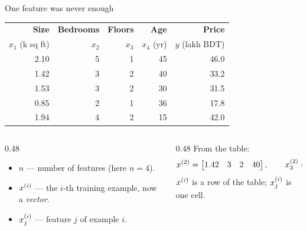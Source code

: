 \documentclass[aspectratio=169,10pt]{beamer}
\begin{document}
\begin{frame}{One feature was never enough}
  \footnotesize
  \begin{center}
  \renewcommand{\arraystretch}{1.25}
  \begin{tabular}{@{}rrrrr@{}}
    \toprule
    \textbf{Size} & \textbf{Bedrooms} & \textbf{Floors} & \textbf{Age} & \textbf{Price}\\
    $x_1$ (k sq ft) & $x_2$ & $x_3$ & $x_4$ (yr) & $y$ (lakh BDT)\\
    \midrule
    2.10 & 5 & 1 &  45 & 46.0\\
    1.42 & 3 & 2 &  40 & 33.2\\
    1.53 & 3 & 2 &  30 & 31.5\\
    0.85 & 2 & 1 &  36 & 17.8\\
    1.94 & 4 & 2 &  15 & 42.0\\
    \bottomrule
  \end{tabular}
  \end{center}
  \begin{columns}[T,onlytextwidth]
    \begin{column}{0.48\textwidth}
      \begin{defnbox}[Notation]
        \small
        \begin{itemize}
          \item $n$ --- number of features (here $n=4$).
          \item $x^{(i)}$ --- the $i$-th training example, now a \emph{vector}.
          \item $x^{(i)}_{j}$ --- feature $j$ of example $i$.
        \end{itemize}
      \end{defnbox}
    \end{column}
    \begin{column}{0.48\textwidth}
      \small
      From the table:
      \[ x^{(2)} = \begin{bmatrix} 1.42 & 3 & 2 & 40\end{bmatrix},\qquad x^{(2)}_{3}=2. \]
      $x^{(i)}$ is a row of the table; $x^{(i)}_{j}$ is one cell.
    \end{column}
  \end{columns}
\end{frame}
\end{document}
